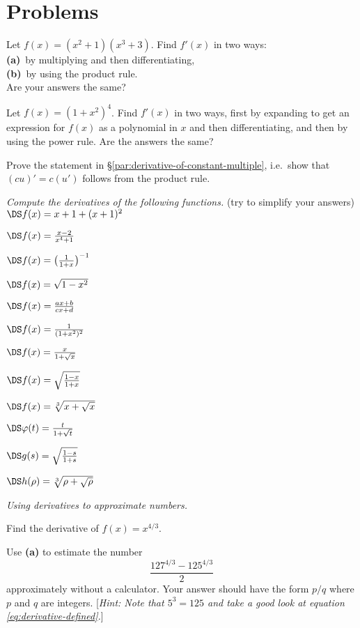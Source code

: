 \section{Problems}
\problemfont
\begin{multicols}{2}\setlength{\parindent}{0pt}
\problem Let $f(x)=(x^2+1)(x^3+3)$. Find $f'(x)$ in two ways:\\
\textbf{(a)}~by multiplying and then differentiating, \\
\textbf{(b)}~by using the product rule.\\
Are your answers the same?


\problem  Let $f(x)=(1+x^2)^4$. Find $f'(x)$ in two ways, first by
expanding to get an expression for $f(x)$ as a polynomial in $x$ and
then differentiating, and then by using the power rule.  Are the
answers the same?


\problem Prove the statement in \S\ref{par:derivative-of-constant-multiple},
i.e.\ show that $(cu)' = c(u')$ follows from the product rule.


\noindent \textit{Compute the derivatives of the following functions.}
(try to simplify your answers)\\

\problem $\DS f(x) = x+1+(x+1)^2$

\problem $\DS f(x) = \frac{x-2}{x^4+1}$

\problem $\DS f(x) = \bigl(\frac{1}{1+x}\bigr)^{-1}$

\problem $\DS f(x) = \sqrt{1-x^2}$

\problem $\DS f(x) = \frac{ax+b}{cx+d}$

\problem $\DS f(x) = \frac1{(1+x^2)^2}$

\problem $\DS f(x) = \frac{x}{1+\sqrt x}$

\problem $\DS f(x) = \sqrt{\frac{1-x}{1+x}}$

\problem $\DS f(x) = \sqrt[3]{x+\sqrt x}$

\problem $\DS \varphi(t) = \frac{t}{1+\sqrt t} $

\problem $\DS g(s) = \sqrt{\frac{1-s}{1+s}} $

\problem $\DS h(\rho) = \sqrt[3]{\rho+\sqrt \rho}$



\problem \groupproblem\textit{Using derivatives to approximate numbers. }

\subprob Find the derivative of $f(x) = x^{4/3}$.

\subprob Use \textbf{(a)} to estimate the number
\[
\frac{127^{4/3}-125^{4/3}}{2}
\]
approximately without a calculator. Your answer should have the form
$p/q$ where $p$ and $q$ are integers.  [\textsl{Hint: Note that
$5^3=125$ and take
a good look at equation \eqref{eq:derivative-defined}.}]


\end{multicols}
